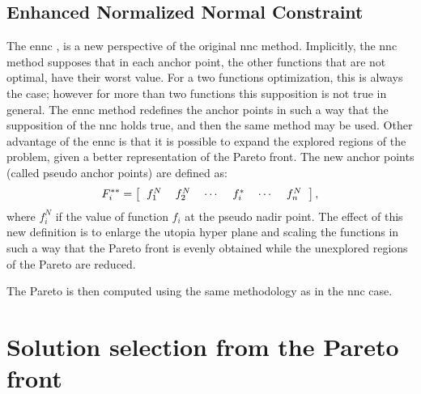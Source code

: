 \subsection{Enhanced Normalized Normal Constraint}
\label{sec:ENNC}
The \gls{ennc} \cite{Sanchis2008}, is a new perspective of the original \gls{nnc} method. Implicitly, the \gls{nnc} method supposes that in each anchor point, the other functions that are not optimal, have their worst value. For a two functions optimization, this is always the case; however for more than two functions this supposition is not true in general. The \gls{ennc} method redefines the anchor points in such a way that the supposition of the \gls{nnc} holds true, and then the same method may be used. Other advantage of the \gls{ennc} is that it is possible to expand the explored regions of the problem, given a better representation of the Pareto front.
%
The new anchor points (called pseudo anchor points) are defined as:
\begin{equation}
F_i^{**} = \left[
\begin{tabular}{cccccc}
$f_1^N$ & $f_2^N$ & $\cdots$ & $f_i^{*}$ & $\cdots$ & $f_n^N$
\end{tabular}
\right],
\label{eq:PseudoAnchor}
\end{equation}
%
where $f_i^N$ if the value of function $f_i$ at the pseudo nadir point. The effect of this new definition is to enlarge the utopia hyper plane and scaling the functions in such a way that the Pareto front is evenly obtained while the unexplored regions of the Pareto are reduced.

The Pareto is then computed using the same methodology as in the \gls{nnc} case.
\section{Solution selection from the Pareto front}
\label{sec:Selection}

%
